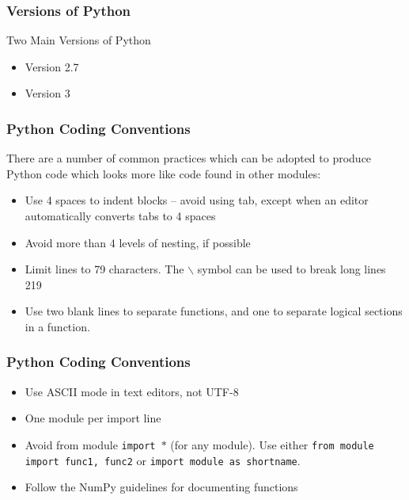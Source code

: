 \documentclass[MASTER.tex]{subfiles}
\begin{document}
 
	
\begin{frame}
	\frametitle{Versions of Python}
	\LARGE
	Two Main Versions of Python
	\begin{itemize}
		\item Version 2.7
		\item Version 3
	\end{itemize}
	
\end{frame}
\begin{frame}
\frametitle{Python Coding Conventions}
\large
There are a number of common practices which can be adopted to produce Python code which looks
more like code found in other modules:
\begin{itemize}
	\item Use 4 spaces to indent blocks – avoid using tab, except when an editor automatically converts tabs
	to 4 spaces
	\item Avoid more than 4 levels of nesting, if possible
	\item Limit lines to 79 characters. The $\backslash$ symbol can be used to break long lines
	219
	\item Use two blank lines to separate functions, and one to separate logical sections in a function.
\end{itemize}
	
\end{frame}
\begin{frame}
\frametitle{Python Coding Conventions}
\large
\begin{itemize}	
	\item Use ASCII mode in text editors, not UTF-8
	\item One module per import line
	\item Avoid from module \texttt{import $\ast$} (for any module). Use either \texttt{from module import func1, func2} or
	\texttt{import module as shortname}.
	\item Follow the NumPy guidelines for documenting functions
\end{itemize}

\end{frame}
\end{document}
